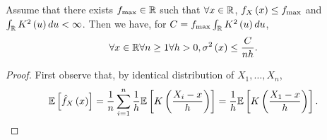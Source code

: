 \begin{proposition}\label{prop:1}
  Assume that there exists $f_{\max}\in \mathbb{R}$ such that $\forall x\in \mathbb{R}$, $f_X\left(x\right)\leq f_{\max}$ and $\int_{\mathbb{R}} K^2\left(u\right)du <\infty$. Then we have, for $C= f_{\max}\int_{\mathbb{R}} K^2\left(u\right)du$,
  \begin{equation*}
    \forall x\in\mathbb{R}\forall n\geq 1 \forall h>0, \sigma^2\left(x\right)\leq \frac{C}{nh}.
  \end{equation*}
\end{proposition}
\begin{proof}
  First observe that, by identical distribution of $X_1,\ldots, X_n$,
  \begin{equation*}\label{eq:expectation}
    \mathbb{E}\left[\hat{f}_X\left(x\right)\right] = \frac{1}{n}\sum_{i=1}^n \frac{1}{h}\mathbb{E}\left[K\left(\frac{X_i-x}{h}\right)\right] = \frac{1}{h}\mathbb{E}\left[K\left(\frac{X_1-x}{h}\right)\right].
  \end{equation*}


\end{proof}
